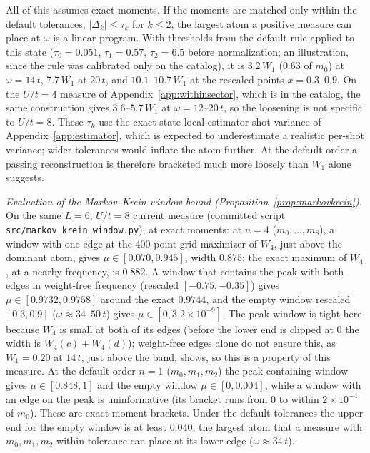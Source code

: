 \documentclass[submission, PhysCore]{SciPost}
\begin{document}
\begin{appendix}
All of this assumes exact moments. If the moments are matched only within the default tolerances, $|\Delta_k|\le\tau_k$ for $k\le2$, the largest atom a positive measure can place at $\omega$ is a linear program. With thresholds from the default rule applied to this state ($\tau_0=0.051$, $\tau_1=0.57$, $\tau_2=6.5$ before normalization; an illustration, since the rule was calibrated only on the catalog), it is $3.2\,W_1$ ($0.63$ of $m_0$) at $\omega=14\,t$, $7.7\,W_1$ at $20\,t$, and $10.1$--$10.7\,W_1$ at the rescaled points $x=0.3$--$0.9$. On the $U/t=4$ measure of Appendix~\ref{app:withinsector}, which is in the catalog, the same construction gives $3.6$--$5.7\,W_1$ at $\omega=12$--$20\,t$, so the loosening is not specific to $U/t=8$. These $\tau_k$ use the exact-state local-estimator shot variance of Appendix~\ref{app:estimator}, which is expected to underestimate a realistic per-shot variance; wider tolerances would inflate the atom further. At the default order a passing reconstruction is therefore bracketed much more loosely than $W_1$ alone suggests.

\emph{Evaluation of the Markov--Krein window bound (Proposition~\ref{prop:markovkrein}).} On the same $L=6$, $U/t=8$ current measure (committed script \texttt{src/\allowbreak markov\_krein\_window.py}), at exact moments: at $n=4$ ($m_0,\dots,m_8$), a window with one edge at the $400$-point-grid maximizer of $W_4$, just above the dominant atom, gives $\mu\in[0.070,0.945]$, width $0.875$; the exact maximum of $W_4$, at a nearby frequency, is $0.882$. A window that contains the peak with both edges in weight-free frequency (rescaled $[-0.75,-0.35]$) gives $\mu\in[0.9732,0.9758]$ around the exact $0.9744$, and the empty window rescaled $[0.3,0.9]$ ($\omega\approx34$--$50\,t$) gives $\mu\in[0,3.2\times10^{-9}]$. The peak window is tight here because $W_4$ is small at both of its edges (before the lower end is clipped at $0$ the width is $W_4(c)+W_4(d)$); weight-free edges alone do not ensure this, as $W_1=0.20$ at $14\,t$, just above the band, shows, so this is a property of this measure. At the default order $n=1$ ($m_0,m_1,m_2$) the peak-containing window gives $\mu\in[0.848,1]$ and the empty window $\mu\in[0,0.004]$, while a window with an edge on the peak is uninformative (its bracket runs from $0$ to within $2\times10^{-4}$ of $m_0$). These are exact-moment brackets. Under the default tolerances the upper end for the empty window is at least $0.040$, the largest atom that a measure with $m_0,m_1,m_2$ within tolerance can place at its lower edge ($\omega\approx34\,t$).


\end{appendix}
\end{document}
